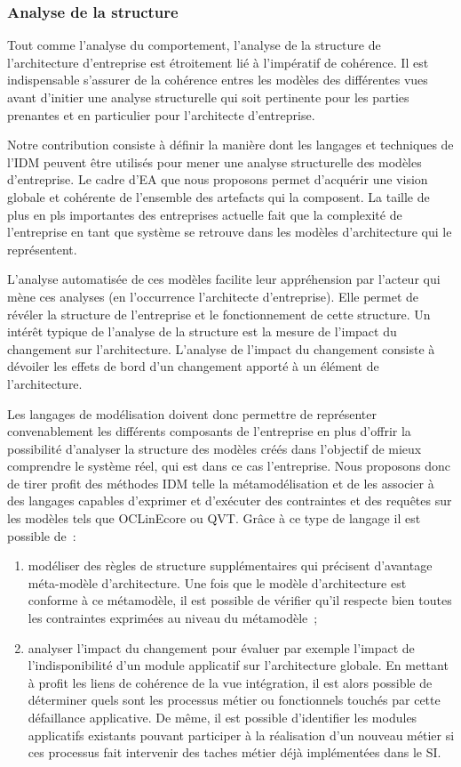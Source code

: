 \subsubsection{Analyse de la structure}
Tout comme l'analyse du comportement, l'analyse de la structure de l'architecture d'entreprise est étroitement lié à l'impératif de cohérence.  Il est indispensable s'assurer de la cohérence entres les modèles des différentes vues avant d'initier une analyse structurelle qui soit pertinente pour les parties prenantes et en particulier pour l'architecte d'entreprise. 

Notre contribution consiste à définir la manière dont les langages et techniques de l'IDM peuvent être utilisés pour mener une analyse structurelle des modèles d'entreprise. Le cadre d'EA que nous proposons permet d'acquérir une vision globale et cohérente de l'ensemble des artefacts qui la composent. La taille de plus en pls importantes des entreprises actuelle fait que la complexité de l'entreprise en tant que système se retrouve dans les modèles d'architecture qui le représentent.

L'analyse automatisée de ces modèles facilite leur appréhension par l'acteur qui mène ces analyses (en l'occurrence l'architecte d'entreprise). Elle permet de révéler la structure de l'entreprise et le fonctionnement de cette structure. Un intérêt  typique de l'analyse de la structure est la mesure de l'impact du changement \cite{de2005change} sur l'architecture. L'analyse de l'impact du changement consiste à dévoiler les effets de bord d'un changement apporté à un élément de l'architecture.  

Les langages de modélisation doivent donc permettre de représenter convenablement les différents composants de l'entreprise en plus d'offrir la possibilité d'analyser la structure des modèles créés dans l'objectif de mieux comprendre le système réel, qui est dans ce cas l'entreprise. Nous proposons donc de tirer profit des méthodes IDM telle la métamodélisation et de les associer à des langages capables d'exprimer et d'exécuter des contraintes et des requêtes sur les modèles tels que OCLinEcore ou QVT. Grâce à ce type de langage il est possible de~:
\begin{enumerate}
\item modéliser des règles de structure supplémentaires qui précisent d'avantage méta-modèle d'architecture. Une fois que le modèle d'architecture est conforme à ce métamodèle, il est possible de vérifier qu'il respecte bien toutes les contraintes exprimées au niveau du métamodèle~;
\item analyser l'impact du changement pour évaluer par exemple l'impact de l'indisponibilité d'un module applicatif sur l'architecture globale. En mettant à profit les liens de cohérence de la vue intégration, il est alors possible de déterminer quels sont les processus métier ou fonctionnels touchés par cette défaillance applicative. De même, il est possible d'identifier les modules applicatifs existants pouvant participer à la réalisation d'un nouveau métier si ces processus fait intervenir des taches métier déjà implémentées dans le SI.
\end{enumerate}




